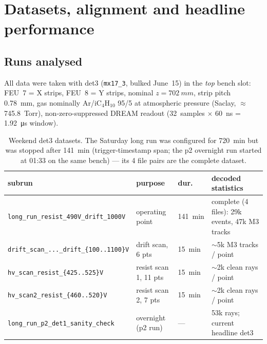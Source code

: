 \documentclass[11pt,a4paper]{article}
\begin{document}
\tableofcontents

\section{Datasets, alignment and headline performance}

\subsection{Runs analysed}

All data were taken with det3 (\texttt{mx17\_3}, bulked June~15) in the
\emph{top} bench slot: FEU~7 = X strips, FEU~8 = Y strips, nominal
\(z=\SI{702}{mm}\), strip pitch \SI{0.78}{mm}, gas nominally
Ar/iC\(_4\)H\(_{10}\) 95/5 at atmospheric pressure
(Saclay, \(\approx\)\SI{745.8}{Torr}), non-zero-suppressed DREAM readout
(32~samples \(\times\) \SI{60}{ns} = \SI{1.92}{\micro s} window).

\begin{table}[H]
\centering\footnotesize
\setlength{\tabcolsep}{4pt}%
\begin{tabular}{llll}
\toprule
subrun & purpose & dur. & decoded statistics \\
\midrule
\texttt{long\_run\_resist\_490V\_drift\_1000V} & operating point & \SI{141}{min}
    & complete (4 files): 29k events, 47k M3 tracks \\
\texttt{drift\_scan\_...\_drift\_\{100..1100\}V} & drift scan, 6 pts & \SI{15}{min}
    & $\sim$5k M3 tracks / point \\
\texttt{hv\_scan\_resist\_\{425..525\}V} & resist scan 1, 11 pts & \SI{15}{min}
    & $\sim$2k clean rays / point \\
\texttt{hv\_scan2\_resist\_\{460..520\}V} & resist scan 2, 7 pts & \SI{15}{min}
    & $\sim$2k clean rays / point \\
\midrule
\texttt{long\_run\_p2\_det1\_sanity\_check} & overnight (p2 run) & ---
    & 53k rays; current headline det3 \\
\bottomrule
\end{tabular}
\caption{Weekend det3 datasets. The Saturday long run was configured for
\SI{720}{min} but was stopped after \SI{141}{min} (trigger-timestamp span;
the p2 overnight run started at 01:33 on the same bench) --- its 4 file pairs
are the complete dataset.}
\label{tab:datasets}
\end{table}
\end{document}
